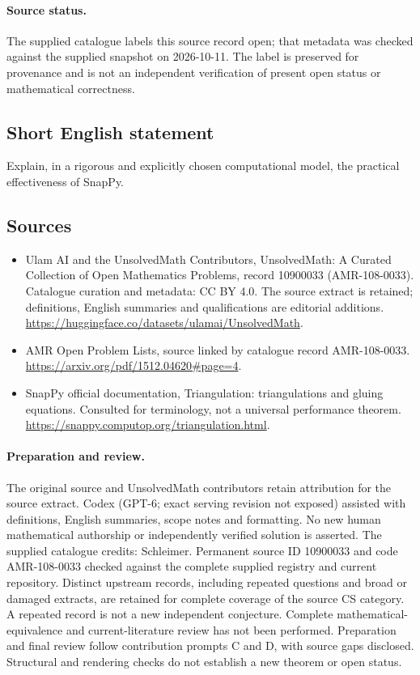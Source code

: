 \documentclass[11pt]{article}
\begin{document}
\paragraph{Source status.}
The supplied catalogue labels this source record open; that metadata was checked against the supplied snapshot on 2026-10-11. The label is preserved for provenance and is not an independent verification of present open status or mathematical correctness.
\subsection{Short English statement}
Explain, in a rigorous and explicitly chosen computational model, the practical effectiveness of SnapPy.
\subsection{Sources}
\begin{itemize}
\item[\hypertarget{source:10900033:1}{S1}] Ulam AI and the UnsolvedMath Contributors, UnsolvedMath: A Curated Collection of Open Mathematics Problems, record 10900033 (AMR-108-0033). Catalogue curation and metadata: CC BY 4.0. The source extract is retained; definitions, English summaries and qualifications are editorial additions.
\url{https://huggingface.co/datasets/ulamai/UnsolvedMath}.
\item[\hypertarget{source:10900033:2}{S2}] AMR Open Problem Lists, source linked by catalogue record AMR-108-0033.
\url{https://arxiv.org/pdf/1512.04620#page=4}.
\item[\hypertarget{source:10900033:3}{S3}] SnapPy official documentation, Triangulation: triangulations and gluing equations. Consulted for terminology, not a universal performance theorem.
\url{https://snappy.computop.org/triangulation.html}.
\end{itemize}
\paragraph{Preparation and review.}
The original source and UnsolvedMath contributors retain attribution for the source extract. Codex (GPT-6; exact serving revision not exposed) assisted with definitions, English summaries, scope notes and formatting. No new human mathematical authorship or independently verified solution is asserted. The supplied catalogue credits: Schleimer. Permanent source ID 10900033 and code AMR-108-0033 checked against the complete supplied registry and current repository. Distinct upstream records, including repeated questions and broad or damaged extracts, are retained for complete coverage of the source CS category. A repeated record is not a new independent conjecture. Complete mathematical-equivalence and current-literature review has not been performed. Preparation and final review follow contribution prompts C and D, with source gaps disclosed. Structural and rendering checks do not establish a new theorem or open status.
\label{end:10900033}
\end{document}
